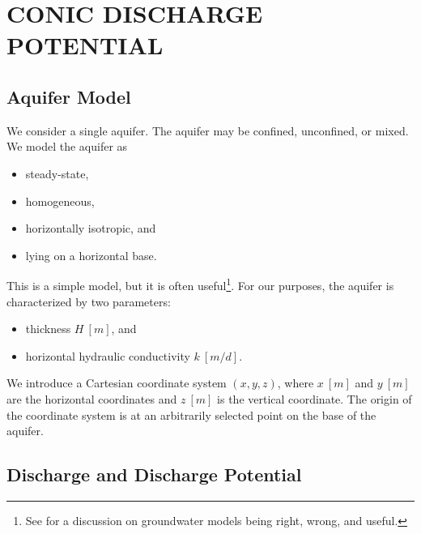 \documentclass[12pt]{report}
\begin{document}
\chapter{CONIC DISCHARGE POTENTIAL}


\section{Aquifer Model}\label{2.1.1}
We consider a single aquifer. The aquifer may be confined, unconfined, or mixed.  We model the aquifer as
%
\begin{itemize}
    \item steady-state,
    \item homogeneous,
    \item horizontally isotropic, and
    \item lying on a horizontal base.
\end{itemize}
%
This is a simple model, but it is often useful\footnote{See \citet{Bakker2013} for a discussion on groundwater models being right, wrong, and useful.}. For our purposes, the aquifer is characterized by two parameters:
%
\begin{itemize}
    \item thickness $H~[m]$, and
    \item horizontal hydraulic conductivity $k~[m/d]$.
\end{itemize}

We introduce a Cartesian coordinate system $(x,y,z)$, where $x~[m]$ and $y~[m]$ are the horizontal coordinates and $z~[m]$ is the vertical coordinate. The origin of the coordinate system is at an arbitrarily selected point on the base of the aquifer.


\section{Discharge and Discharge Potential}\label{2.2.1}
\end{document}
